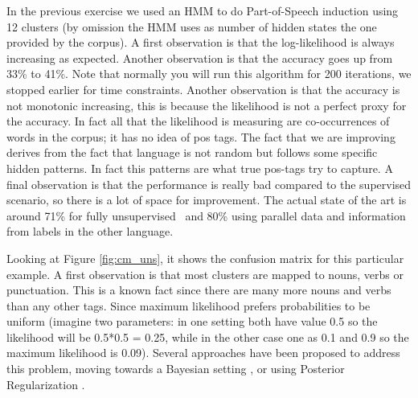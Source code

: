In the previous exercise we used an HMM to do Part-of-Speech induction using 12 clusters (by omission the HMM uses as number of hidden states the one provided by the corpus). A first observation is that the log-likelihood is always increasing as expected. Another observation is that the accuracy goes up from 33\% to 41\%. 
Note that normally you will run this algorithm for 200 iterations, we stopped earlier for time constraints. Another observation is that the accuracy is not monotonic increasing, this is because the likelihood is not a perfect proxy for the accuracy. In fact all that the likelihood is measuring are co-occurrences of words in the corpus; it has no idea of pos tags. The fact that we are improving derives from the fact that language is not random but follows some specific hidden patterns. In fact this patterns are what true pos-tags try to capture. A final observation is that the performance is really bad compared to the supervised scenario, so there is a lot of space for improvement. The actual state of the art is around 71\% for fully unsupervised~\citep{JoaoThesis,bergkirkpatrick2010naacl} and 80\% \citep{das-petrov:2011:ACL-HLT2011} using parallel data and information from labels in the other language. 

Looking at Figure \ref{fig:cm_uns}, it shows the confusion matrix for this particular example. 
A first observation is that most clusters are mapped to nouns, verbs or punctuation. 
This is a known fact since there are many more nouns and verbs than any other tags. Since maximum likelihood prefers probabilities 
to be uniform (imagine two parameters: in one setting both have value 0.5 so the likelihood will be 0.5*0.5 = 0.25, 
while in the other case one as 0.1 and 0.9 so the maximum likelihood is 0.09). Several approaches have been proposed to 
address this problem, moving towards a Bayesian setting \citep{johnson2007dtf}, or using 
Posterior Regularization \citep{graca2009nips}. 









